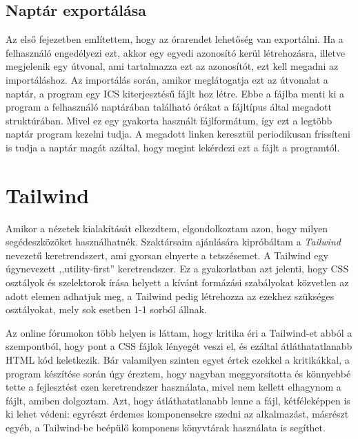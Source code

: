 \documentclass[
]{thesis-ekf}
\theoremstyle{definition}
\theoremstyle{remark}
\begin{document}
\subsection{Naptár exportálása}

Az első fejezetben említettem, hogy az órarendet lehetőség van exportálni. Ha a felhasználó engedélyezi ezt, akkor egy egyedi azonosító kerül létrehozásra, illetve megjelenik egy útvonal, ami tartalmazza ezt az azonosítót, ezt kell megadni az importáláshoz. Az importálás során, amikor meglátogatja ezt az útvonalat a naptár, a program egy ICS kiterjesztésű fájlt hoz létre. Ebbe a fájlba menti ki a program a felhasználó naptárában található órákat a fájltípus által megadott struktúrában.\cite{icsFormat} Mivel ez egy gyakorta használt fájlformátum, így ezt a legtöbb naptár program kezelni tudja. A megadott linken keresztül periodikusan frissíteni is tudja a naptár magát azáltal, hogy megint lekérdezi ezt a fájlt a programtól.

 

\section{Tailwind}

Amikor a nézetek kialakítását elkezdtem, elgondolkoztam azon, hogy milyen segédeszközöket használhatnék. Szaktársaim ajánlására kipróbáltam a \emph{Tailwind} nevezetű keretrendszert, ami gyorsan elnyerte a tetszésemet. A Tailwind egy  úgynevezett ,,utility-first'' keretrendszer.\cite{tailwind} Ez a gyakorlatban azt jelenti, hogy CSS\cite{css} osztályok és szelektorok írása helyett a kívánt formázási szabályokat közvetlen az adott elemen adhatjuk meg, a Tailwind pedig létrehozza az ezekhez szükséges osztályokat, mely sok esetben 1-1 sorból állnak. 



Az online fórumokon több helyen is láttam, hogy kritika éri a Tailwind-et abból a szempontból, hogy pont a CSS fájlok lényegét veszi el, és ezáltal átláthatatlanabb HTML kód keletkezik. Bár valamilyen szinten egyet értek ezekkel a kritikákkal, a program készítése során úgy éreztem, hogy nagyban meggyorsította és könnyebbé tette a fejlesztést ezen keretrendszer használata, mivel nem kellett elhagynom a fájlt, amiben dolgoztam. Azt, hogy átláthatatlanabb lenne a fájl, kétféleképpen is ki lehet védeni: egyrészt érdemes komponensekre szedni az alkalmazást, másrészt egyéb, a Tailwind-be beépülő komponens könyvtárak használata is segíthet.
\end{document}

